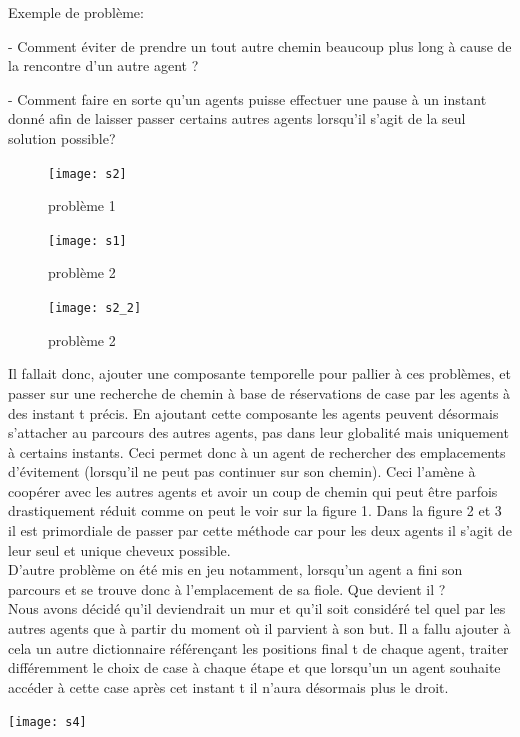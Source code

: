 \documentclass{article}
\begin{document}
Exemple de problème:


 - Comment éviter de prendre un tout autre chemin beaucoup plus long à cause de la rencontre d’un autre agent ?

 - Comment faire en sorte qu’un agents puisse effectuer une pause à un instant donné afin de laisser passer certains autres agents lorsqu'il s'agit de la seul solution possible?


\begin{figure}[h]
   \begin{minipage}{0.5\textwidth}
     \centering
     \texttt{[image: s2]}
     \caption{problème 1 }\label{Fig:1}
   \end{minipage}\hfill
   \begin{minipage}{0.5\textwidth}
     \centering
     \texttt{[image: s1]}
     \caption{problème 2}\label{Fig:2}
     \end{minipage}
\end{figure}

\begin{figure}
     \centering
     \texttt{[image: s2\_2]}
     \caption{problème 2}\label{Fig:3}
\end{figure}
\newpage
Il fallait donc, ajouter une composante temporelle pour pallier à ces problèmes, et passer sur une recherche de chemin à base de réservations de case par les  agents à des instant t précis. En ajoutant cette composante les agents peuvent désormais s’attacher au parcours des autres agents, pas dans leur globalité mais uniquement à certains instants. Ceci permet donc à un agent de rechercher des emplacements d’évitement (lorsqu’il ne peut pas continuer sur son chemin). Ceci l'amène à coopérer avec les autres agents et avoir un coup de chemin qui peut être parfois drastiquement réduit comme on peut le voir sur la figure 1. Dans la figure 2 et 3 il est primordiale de passer par cette méthode car pour les deux agents il s'agit de leur seul et unique cheveux possible.
\\


D’autre problème on été mis en jeu notamment, lorsqu’un agent a fini son parcours et se trouve donc à l’emplacement de sa fiole. Que devient il ?\\

Nous avons décidé qu’il deviendrait un mur et qu’il soit considéré tel quel par les autres agents que à partir du moment où il parvient à son but. Il a fallu ajouter à cela un autre dictionnaire référençant les positions final t de chaque agent, traiter différemment le choix de case à chaque étape et que lorsqu’un un agent souhaite accéder à cette case après cet instant t il n’aura désormais plus le droit. 
\\
\begin{center}
	\texttt{[image: s4]}
\end{center}
\end{document}
